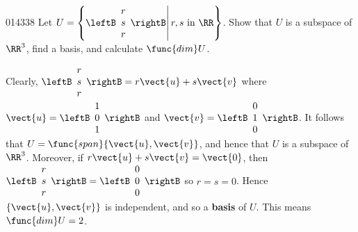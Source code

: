 \begin{example}{}{014338}
Let
$U = \left \{
\leftB \begin{array}{r}
r \\
s \\
r
\end{array} \rightB
\middle| \, r, s \mbox{ in } \RR
\right \}$. Show that $U$ is a subspace of $\RR^3$, find a basis, and calculate $\func{dim} U$.

\begin{solution}
Clearly, 
$\leftB \begin{array}{r}
r \\
s \\
r
\end{array} \rightB
= r\vect{u} + s\vect{v}$ where 
$\vect{u} = 
\leftB \begin{array}{r}
1 \\
0\\
1
\end{array} \rightB$ and 
$\vect{v} =
\leftB \begin{array}{r}
0 \\
1 \\ 
0
\end{array} \rightB$. It follows that $U = \func{span}\{\vect{u}, \vect{v}\}$, and hence that $U$ is a subspace of $\RR^3$. Moreover, if $r\vect{u} + s\vect{v} = \vect{0}$, then 
$\leftB \begin{array}{rrr}
r \\
s \\
r
\end{array} \rightB
= 
\leftB \begin{array}{rrr}
0 \\
0 \\
0
\end{array} \rightB$ so $r = s = 0$. Hence $\{\vect{u}, \vect{v}\}$ is independent, and so a \textbf{basis} of $U$. This means $\func{dim} U = 2$.
\end{solution}
\end{example}


